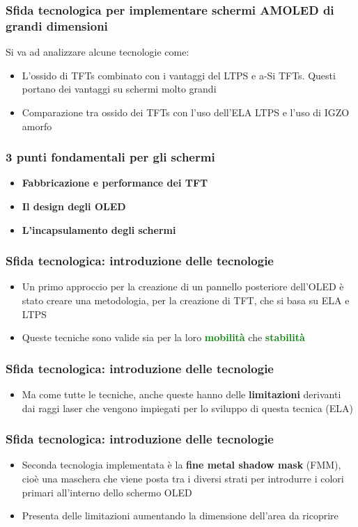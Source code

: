 \documentclass[12pt]{beamer}
\begin{document}
	\begin{frame}
		\frametitle{Sfida tecnologica per implementare schermi AMOLED di grandi dimensioni}
		Si va ad analizzare alcune tecnologie come:
		\begin{itemize}
			\item L’ossido di TFTs combinato con i vantaggi
			del LTPS e a-Si TFTs. Questi portano dei vantaggi su schermi molto grandi
			\pause
			\item Comparazione tra ossido dei TFTs con l'uso dell'ELA LTPS e l'uso di IGZO amorfo
		\end{itemize}
	\end{frame}
	\begin{frame}
		\frametitle{3 punti fondamentali per gli schermi}
		\begin{itemize}
			\item \textbf{Fabbricazione e performance dei TFT}
			\pause
			\item \textbf{Il design degli OLED} 
			\pause
			\item \textbf{L'incapsulamento degli schermi}
		\end{itemize}
	\end{frame}
	\begin{frame}
		\frametitle{Sfida tecnologica: introduzione delle tecnologie}
		\begin{itemize}
			\item Un primo approccio per la creazione di un pannello posteriore dell'OLED è stato creare una metodologia, per la creazione di TFT, che si basa su ELA e LTPS
			\pause
			\item Queste tecniche sono valide sia per la loro \textbf{\textcolor{green}{mobilità}} che \textbf{\textcolor{green}{stabilità}} 
		\end{itemize}
	\end{frame}
	\begin{frame}
		\frametitle{Sfida tecnologica: introduzione delle tecnologie}
		\begin{itemize}
			\item Ma come tutte le tecniche, anche queste hanno delle \textbf{limitazioni} derivanti dai raggi laser che vengono impiegati per lo sviluppo di questa tecnica (ELA)
		\end{itemize}
	\end{frame}
	\begin{frame}
		\frametitle{Sfida tecnologica: introduzione delle tecnologie}
		\begin{itemize}
			\item Seconda tecnologia implementata è la \textbf{fine metal shadow mask} (FMM), cioè una maschera che viene posta tra i diversi strati per introdurre i colori primari all'interno dello schermo OLED
			\pause
			\item Presenta delle limitazioni aumentando la dimensione dell'area da ricoprire
		\end{itemize}
	\end{frame}
\end{document}
